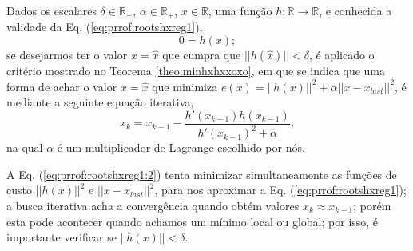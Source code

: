 \begin{myproofT}\label{proof:theo:rootshxreg}
Dados
os escalares $\delta \in \mathbb{R}_+$,
$\alpha \in \mathbb{R}_+$, 
$x \in \mathbb{R}$, 
uma função $h:\mathbb{R} \rightarrow \mathbb{R}$, e 
conhecida a validade da Eq. (\ref{eq:prrof:rootshxreg1}),
\begin{equation}\label{eq:prrof:rootshxreg1}
0=h(x);
\end{equation}
se desejarmos ter o valor $x=\hat{x}$ que cumpra que $||h(\hat{x})||<\delta$, 
é aplicado o critério mostrado no Teorema \ref{theo:minhxhxxoxo},
em que se indica que uma forma de achar o valor 
$x=\hat{x}$ que minimiza $e(x)=||h(x)||^2+\alpha||x-x_{last}||^2$, 
é mediante a seguinte equação iterativa,  
\begin{equation}\label{eq:prrof:rootshxreg1:2}
x_{k}=x_{k-1}-\frac{h'(x_{k-1}) h(x_{k-1})}{h'(x_{k-1})^2+\alpha};
\end{equation}
na qual $\alpha$ é um multiplicador de Lagrange escolhido por nós.

A Eq. (\ref{eq:prrof:rootshxreg1:2}) tenta minimizar simultaneamente 
as funções de custo $||h(x)||^2$ 
e $||x-x_{last}||^2$, para nos aproximar a Eq. (\ref{eq:prrof:rootshxreg1});
a busca iterativa acha a convergência quando obtém valores $x_{k}\approx x_{k-1}$;
porém esta pode acontecer quando achamos um mínimo local ou global;
por isso, é importante verificar se $||h(x)||<\delta$. 
\end{myproofT}
